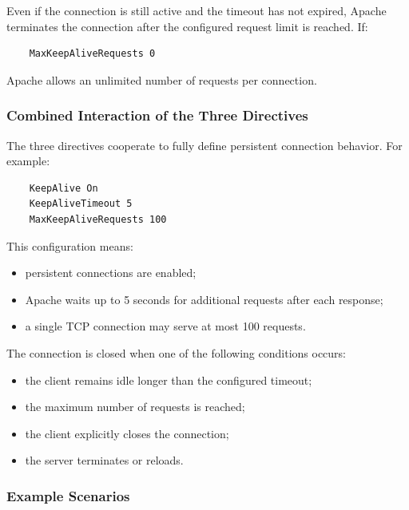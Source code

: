 \documentclass{scrbook}
\begin{document}
	Even if the connection is still active and the timeout has not expired, Apache terminates the connection after the configured request limit is reached. If:
	\begin{lstlisting}
	MaxKeepAliveRequests 0
	\end{lstlisting}
	
	Apache allows an unlimited number of requests per connection.
	
	\subsubsection{Combined Interaction of the Three Directives}
	
	The three directives cooperate to fully define persistent connection behavior. For example:
	
	\begin{lstlisting}
	KeepAlive On
	KeepAliveTimeout 5
	MaxKeepAliveRequests 100
	\end{lstlisting}
	
	This configuration means:
	
	\begin{itemize}
		\item persistent connections are enabled;
		
		\item Apache waits up to 5 seconds for additional requests after each response;
		
		\item a single TCP connection may serve at most 100 requests.
	\end{itemize}
	
	The connection is closed when one of the following conditions occurs:
	\begin{itemize}
		\item the client remains idle longer than the configured timeout;
		
		\item the maximum number of requests is reached;
		
		\item the client explicitly closes the connection;
		
		\item the server terminates or reloads.
	\end{itemize}
	
	\subsubsection{Example Scenarios}
	
\end{document}
